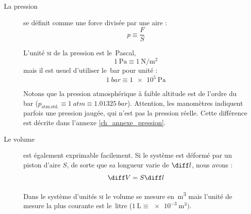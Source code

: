 		\clearfloats
		\begin{description}

			\item[La pression]{se définit comme une force divisée par une aire :
			\begin{equation}
				p \equiv \frac{F}{S}
				\label{def_pression}
			\end{equation}

			L’unité \textsc{si} de la pression est le~\si{Pascal},
			\begin{equation}
				\SI{1}{\pascal} \equiv \SI{1}{\newton\per\metre\squared}
			\end{equation}
			mais il est usuel d’utiliser le~\si{bar} pour unité :
			\begin{equation}
			\SI{1}{bar} \equiv \SI{1e5}{\pascal}
			\end{equation}

			Notons que la pression atmosphérique à faible altitude est de l’ordre du bar ($p_{\text{atm.std.}} \equiv \SI{1}{atm} \equiv \SI{1,01325}{bar}$). Attention, les manomètres indiquent parfois une pression jaugée, qui n’est pas la pression réelle. Cette différence est décrite dans l’annexe \ref{ch_annexe_pression}.
			}%

			\item[Le volume]{est également exprimable facilement. Si le système est déformé par un piston d’aire $S$, de sorte que sa longueur varie de $\diff l$, nous avons :
			\begin{equation}
			\diff V = S \diff l
			\label{eq_volume_surface_longueur}
			\end{equation}

			Dans le système d’unités \textsc{si} le volume se mesure en~\si{\metre\cubed} mais l’unité de mesure la plus courante est le~\si{litre} ($\SI{1}{\liter} \equiv \SI{e-3}{\metre\cubed})$.
			}%
		
		\end{description}


